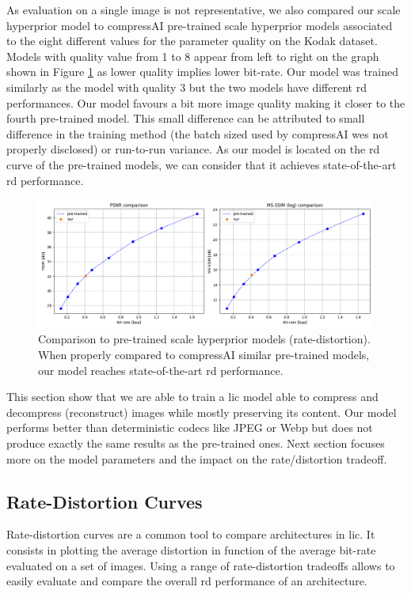 As evaluation on a single image is not representative, we also compared our scale hyperprior model to compressAI pre-trained scale hyperprior models associated to the eight different values for the parameter \textsf{quality} on the Kodak dataset. Models with \textsf{quality} value from 1 to 8 appear from left to right on the graph shown in Figure \ref{balle_repro_6} as lower quality implies lower bit-rate. Our model was trained similarly as the model with \textsf{quality} 3 but the two models have different \acrshort{rd} performances. Our model favours a bit more image quality making it closer to the fourth pre-trained model. This small difference can be attributed to small difference in the training method (the batch sized used by compressAI wes not properly disclosed) or run-to-run variance. As our model is located on the \acrshort{rd} curve of the pre-trained models, we can consider that it achieves state-of-the-art \acrshort{rd} performance. 

\begin{figure}
    \centering
    \includegraphics[width=15cm]{img/balle_repro_6.png}
    \caption[Comparison to pre-trained scale hyperprior models (rate-distortion).]{Comparison to pre-trained scale hyperprior models (rate-distortion). When properly compared to compressAI similar pre-trained models, our model reaches state-of-the-art \acrshort{rd} performance.}
    \label{balle_repro_6}
\end{figure}

This section show that we are able to train a \acrshort{lic} model able to compress and decompress (reconstruct) images while mostly preserving its content. Our model performs better than deterministic codecs like JPEG or Webp but does not produce exactly the same results as the pre-trained ones. Next section focuses more on the model parameters and the impact on the rate/distortion tradeoff.

\subsection{Rate-Distortion Curves}
Rate-distortion curves are a common tool to compare  architectures in \acrshort{lic}. It consists in plotting the average distortion in function of the average bit-rate evaluated on a set of images. Using a range of rate-distortion tradeoffs allows to easily evaluate and compare the overall \acrshort{rd} performance of an architecture.

